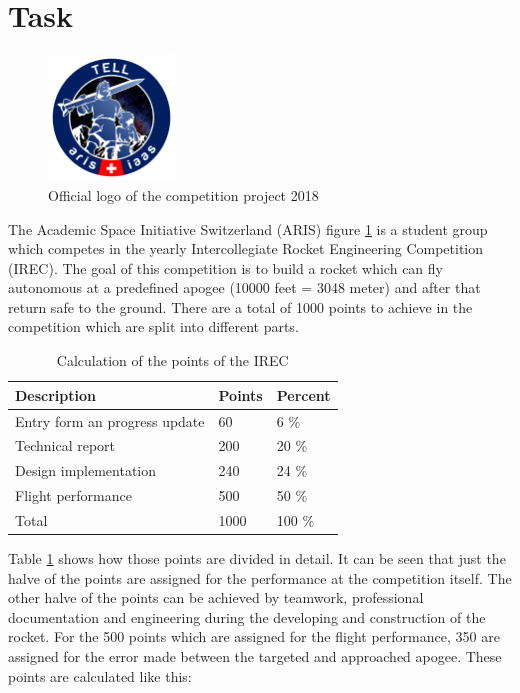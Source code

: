  \section{Task}
 
 \begin{figure}[h!]
 \centering
 \includegraphics[width=0.3\textwidth]{./Pictures/ARIS_TELL_Badge.png}
 \caption{Official logo of the competition project 2018}
 \label{fig:ArisTell}
\end{figure}

 The Academic Space Initiative Switzerland (ARIS) figure \ref{fig:ArisTell} is a student group which competes in the yearly Intercollegiate Rocket Engineering Competition (IREC).
 The goal of this competition is to build a rocket which can fly autonomous at a predefined apogee (10000 feet = 3048 meter) and after that return safe to the ground.
 There are a total of 1000 points to achieve in the competition which are split into different parts.
 
\begin{table}[h]
\centering
\begin{tabular}{|l|l|l|}\hline
{\bf Description} & {\bf Points} & {\bf Percent}\\\hline
Entry form an progress update & 60 & 6 \% \\ \hline
Technical report & 200 & 20 \% \\ \hline
Design implementation & 240 & 24 \% \\ \hline
Flight performance & 500 & 50 \% \\ \hline
Total & 1000 & 100 \% \\ \hline 
\end{tabular}
\caption{Calculation of the points of the IREC}
\label{tab:CompetitionCalculation}
\end{table}  

 Table \ref{tab:CompetitionCalculation} shows how those points are divided in detail. 
 It can be seen that just the halve of the points are assigned for the performance at the competition itself.
 The other halve of the points can be achieved by teamwork, professional documentation and engineering during the developing and construction of the rocket.
 For the 500 points which are assigned for the flight performance, 350 are assigned for the error made between the targeted and approached apogee.
 These points are calculated like this:
 
